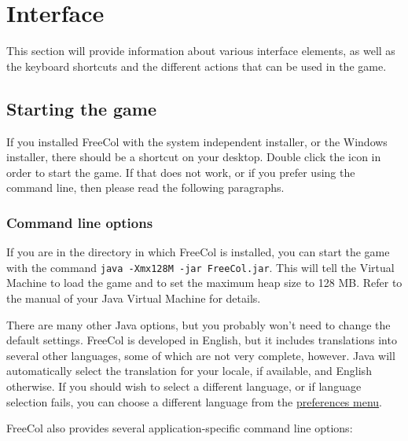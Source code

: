 \documentclass[12pt]{book}
\begin{document}
\hypertarget{Interface}{\chapter{Interface}}

This section will provide information about various interface
elements, as well as the keyboard shortcuts and the different actions
that can be used in the game.

\hypertarget{Starting the game}{\section{Starting the game}}

If you installed FreeCol with the system independent installer, or the
Windows installer, there should be a shortcut on your desktop. Double
click the icon in order to start the game. If that does not work, or
if you prefer using the command line, then please read the following
paragraphs.


\hypertarget{Command line options}{\subsection{Command line options}}

If you are in the directory in which FreeCol is installed, you can
start the game with the command \verb$java -Xmx128M -jar FreeCol.jar$.
This will tell the Virtual Machine to load the game and to set the
maximum heap size to 128 MB. Refer to the manual of your Java Virtual
Machine for details.

There are many other Java options, but you probably won't need to
change the default settings. FreeCol is developed in English, but it
includes translations into several other languages, some of which are
not very complete, however. Java will automatically select the
translation for your locale, if available, and English otherwise. If
you should wish to select a different language, or if language
selection fails, you can choose a different language from the
\hyperlink{Client options}{preferences menu}.

FreeCol also provides several application-specific command line
options:
\end{document}
